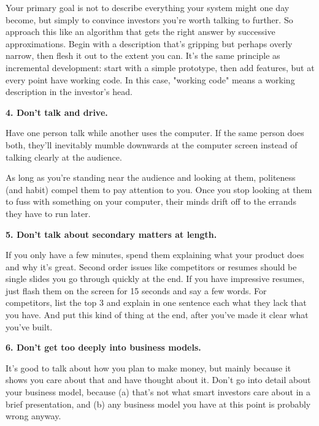 Your primary goal is
                    not to describe everything your system might one day become,
                    but simply to convince investors you're worth talking to
                    further. So approach this like an algorithm that gets the
                    right answer by successive approximations. Begin with a
                    description that's gripping but perhaps overly narrow, then
                    flesh it out to the extent you can. It's the same principle
                    as incremental development: start with a simple prototype,
                    then add features, but at every point have working code. In
                    this case, "working code" means a working description in the
                    investor's head.

\textbf{4. Don't talk and drive.}

Have one person talk while another uses the
                    computer. If the same person does both, they'll inevitably
                    mumble downwards at the computer screen instead of talking
                    clearly at the audience.

As long as you're
                    standing near the audience and looking at them, politeness
                    (and habit) compel them to pay attention to you. Once you
                    stop looking at them to fuss with something on your
                    computer, their minds drift off to the errands they have to
                    run later.

\textbf{5. Don't talk about secondary matters at length.}

If you only have a few minutes, spend them
                    explaining what your product does and why it's great. Second
                    order issues like competitors or resumes should be single
                    slides you go through quickly at the end. If you have
                    impressive resumes, just flash them on the screen for 15
                    seconds and say a few words. For competitors, list the top 3
                    and explain in one sentence each what they lack that you
                    have. And put this kind of thing at the end, after you've
                    made it clear what you've built.

\textbf{6. Don't get too deeply into business models.}

It's good to talk about how you plan to make
                    money, but mainly because it shows you care about that and
                    have thought about it. Don't go into detail about your
                    business model, because (a) that's not what smart investors
                    care about in a brief presentation, and (b) any business
                    model you have at this point is probably wrong anyway.

